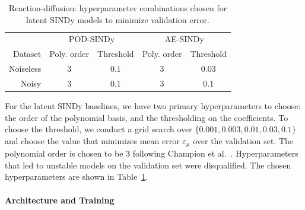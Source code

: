 \documentclass{article}
\begin{document}
	\begin{table}
		\centering
		\caption{Reaction-diffusion: hyperparameter combinations chosen for latent SINDy models to minimize validation error.}
		\label{tab:reactiondiffusion_sindyhyp}
		\begin{tabular}{r|cc|cc}
			\toprule
			& \multicolumn{2}{c}{POD-SINDy} & \multicolumn{2}{c}{AE-SINDy} \\
			Dataset & Poly. order & Threshold & Poly. order & Threshold \\
			\midrule
			Noiseless & $3$ & $0.1$ & $3$ & $0.03$ \\
			Noisy & $3$ & $0.1$ & $3$ & $0.1$ \\
			\bottomrule
		\end{tabular}
	\end{table}
	
	For the latent SINDy baselines, we have two primary hyperparameters to choose: the order of the polynomial basis, and the thresholding on the coefficients. To choose the threshold, we conduct a grid search over $\{0.001, 0.003, 0.01, 0.03, 0.1\}$ and choose the value that minimizes mean error $\varepsilon_\mu$ over the validation set. The polynomial order is chosen to be $3$ following Champion et al.~\cite{Champion_2019_Data_Driven_Coordinates}. Hyperparameters that led to unstable models on the validation set were disqualified. The chosen hyperparameters are shown in Table~\ref{tab:reactiondiffusion_sindyhyp}.
	
	\paragraph{Architecture and Training}
	
\end{document}
